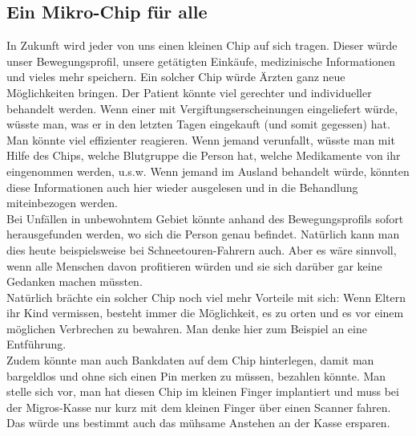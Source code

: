 \subsection{Ein Mikro-Chip für alle}
In Zukunft wird jeder von uns einen kleinen Chip auf 
sich tragen. Dieser würde unser Bewegungsprofil, unsere getätigten 
Einkäufe, medizinische Informationen und vieles mehr speichern. Ein 
solcher Chip würde Ärzten ganz neue Möglichkeiten bringen. 
Der Patient k\"onnte viel gerechter und individueller behandelt werden. Wenn 
einer mit Vergiftungserscheinungen eingeliefert würde, wüsste man, was 
er in den letzten Tagen eingekauft (und somit gegessen) hat. Man 
könnte viel effizienter reagieren. Wenn jemand verunfallt, wüsste man 
mit Hilfe des Chips, welche Blutgruppe die Person hat, welche 
Medikamente von ihr eingenommen werden, u.s.w. Wenn jemand im Ausland 
behandelt würde, könnten diese Informationen auch hier wieder 
ausgelesen und in die Behandlung miteinbezogen werden.\\
Bei Unfällen in unbewohntem Gebiet könnte anhand des Bewegungsprofils 
sofort herausgefunden werden, wo sich die Person genau befindet. 
Natürlich kann man dies heute beispielsweise bei Schneetouren-Fahrern 
auch. Aber es wäre sinnvoll, wenn alle Menschen davon profitieren 
würden und sie sich darüber gar keine Gedanken machen müssten.\\
Natürlich brächte ein solcher Chip noch viel mehr Vorteile mit sich: 
Wenn Eltern ihr Kind vermissen, besteht immer die Möglichkeit, es zu 
orten und es vor einem möglichen Verbrechen zu bewahren. Man denke hier 
zum Beispiel an eine Entführung. \\
Zudem könnte man auch Bankdaten auf dem Chip hinterlegen, damit man 
bargeldlos und ohne sich einen Pin merken zu müssen, bezahlen könnte. 
Man stelle sich vor, man hat diesen Chip im kleinen Finger implantiert 
und muss bei der Migros-Kasse nur kurz mit dem kleinen Finger über 
einen Scanner fahren. Das würde uns bestimmt auch das mühsame Anstehen 
an der Kasse ersparen.
